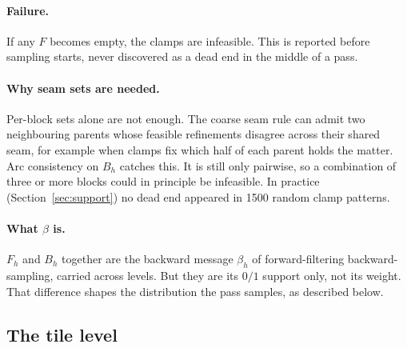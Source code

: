 \documentclass[11pt]{article}
\newcommand{\1}{\mathds{1}}
\begin{document}
\paragraph{Failure.} If any $F$ becomes empty, the clamps are infeasible. This is reported
before sampling starts, never discovered as a dead end in the middle of a pass.

\paragraph{Why seam sets are needed.} Per-block sets alone are not enough. The coarse seam rule
can admit two neighbouring parents whose feasible refinements disagree across their shared seam,
for example when clamps fix which half of each parent holds the matter. Arc consistency on
$B_h$ catches this. It is still only pairwise, so a combination of three or more blocks could in
principle be infeasible. In practice (Section~\ref{sec:support}) no dead end appeared in 1500
random clamp patterns.

\paragraph{What $\beta$ is.} $F_h$ and $B_h$ together are the backward message $\beta_h$ of
forward-filtering backward-sampling, carried across levels. But they are its $0/1$ support
only, not its weight. That difference shapes the distribution the pass samples, as described
below.

\subsection{The tile level}
\end{document}
